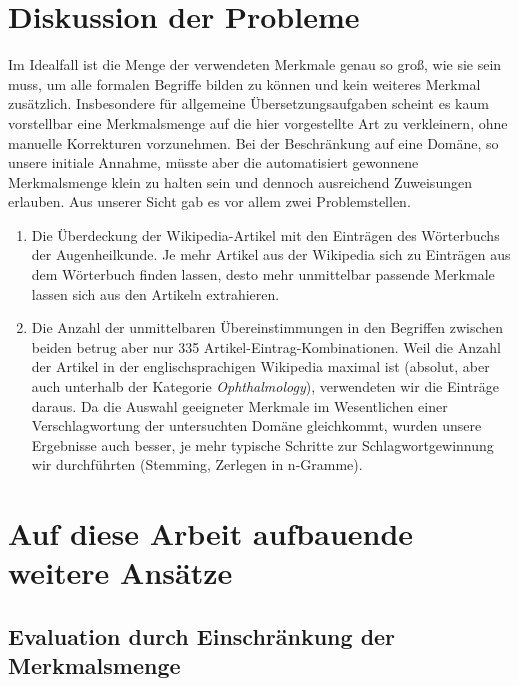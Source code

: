 \documentclass[pagesize,DIV=calc,12pt,draft]{scrreprt}
\begin{document}
\section{Diskussion der Probleme}

Im Idealfall ist die Menge der verwendeten Merkmale genau so groß, wie sie sein muss, um alle formalen Begriffe bilden zu können und kein weiteres Merkmal zusätzlich. 
Insbesondere für allgemeine Übersetzungsaufgaben scheint es kaum vorstellbar eine Merkmalsmenge auf die hier vorgestellte Art zu verkleinern, ohne manuelle Korrekturen vorzunehmen. 
Bei der Beschränkung auf eine Domäne, so unsere initiale Annahme, müsste aber die automatisiert gewonnene Merkmalsmenge klein zu halten sein und dennoch ausreichend Zuweisungen erlauben. 
Aus unserer Sicht gab es vor allem zwei Problemstellen. 
\begin{enumerate}
\item Die Überdeckung der Wikipedia-Artikel mit den Einträgen des Wörterbuchs der Augenheilkunde. 
Je mehr Artikel aus der Wikipedia sich zu Einträgen aus dem Wörterbuch finden lassen, desto mehr unmittelbar passende Merkmale lassen sich aus den Artikeln extrahieren. 
\item Die Anzahl der unmittelbaren Übereinstimmungen in den Begriffen zwischen beiden betrug aber nur 335 Artikel-Eintrag-Kombinationen. 
Weil die Anzahl der Artikel in der englischsprachigen Wikipedia maximal ist (absolut, aber auch unterhalb der Kategorie \emph{Ophthalmology}), verwendeten wir die Einträge daraus. 
Da die Auswahl geeigneter Merkmale im Wesentlichen einer Verschlagwortung der untersuchten Domäne gleichkommt, wurden unsere Ergebnisse auch besser, je mehr typische Schritte zur Schlagwortgewinnung wir durchführten (Stemming, Zerlegen in n-Gramme). 
\end{enumerate}

\section{Auf diese Arbeit aufbauende weitere Ansätze}
\subsection{Evaluation durch Einschränkung der Merkmalsmenge}
\end{document}
